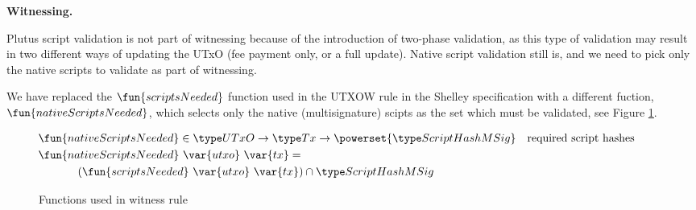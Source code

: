 \clearpage

\textbf{Witnessing.}

Plutus script validation is not part of witnessing because of the introduction
of two-phase validation, as this type of validation may result in two
different ways of updating the UTxO (fee payment only, or a full update).
Native script validation
still is, and we need to pick only the native scripts to validate as
part of witnessing.

We have replaced the $\fun{scriptsNeeded}$ function used in the UTXOW rule
in the Shelley specification
with a different fuction, $\fun{nativeScriptsNeeded}$, which selects only
the native (multisignature) scipts as the set which must be validated, see Figure
\ref{fig:functions-witnesses}.


\begin{figure}[htb]
  \begin{align*}
    & \hspace{-1cm}\fun{nativeScriptsNeeded} \in \UTxO \to \Tx \to
      \powerset{\ScriptHashMSig}
    & \text{required script hashes} \\
    &  \hspace{-1cm}\fun{nativeScriptsNeeded}~\var{utxo}~\var{tx} = \\
    & ~~(\fun{scriptsNeeded}~\var{utxo}~\var{tx}) \cap \ScriptHashMSig
  \end{align*}
  \caption{Functions used in witness rule}
  \label{fig:functions-witnesses}
\end{figure}

\clearpage
